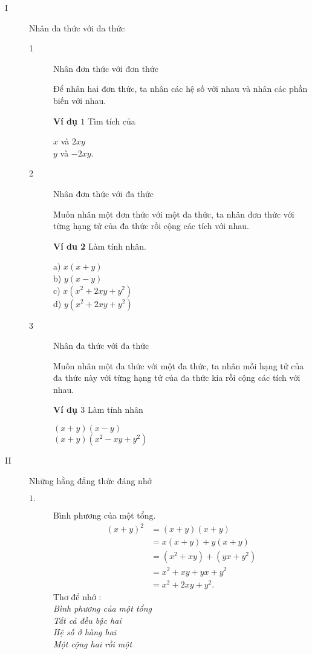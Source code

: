 \documentclass[14pt,twoside,a4paper, openany]{book}
\theoremstyle{definition}
\theoremstyle{plain}
\newcommand{\hop}[1]{\begin{tcolorbox}[colback=cyan!15,colframe=orange!75!white]{#1}\end{tcolorbox}}
\begin{document}
\boldmath
\begin{description}
\item[I] Nhân đa thức với đa thức
\begin{description}
\item[1] Nhân đơn thức với đơn thức
\hop{
Để nhân hai đơn thức, ta nhân các hệ số với nhau và nhân các phần biến với nhau.
}
\textbf{Ví dụ $1$} Tìm tích của
\begin{multicols}{2}
 $x$ và $2xy$\\
$y$ và $-2xy$.
\end{multicols}


\item[2] Nhân đơn thức với đa thức
\hop{
Muốn nhân một đơn thức với một đa thức, ta nhân đơn thức với từng hạng tử của đa thức rồi cộng các tích với nhau.}
\textbf{Ví du 2} Làm tính nhân.
\begin{multicols}{2}
\noindent a) $x(x+y)$\\
b) $y(x-y)$\\
c) $x(x^2+2xy+y^2)$\\
d) $y(x^2+2xy+y^2)$
\end{multicols}


\item[3] Nhân đa thức với đa thức
\hop{Muốn nhân một đa thức với một đa thức, ta nhân mỗi hạng tử của đa thức này với từng hạng tử của đa thức kia rồi cộng các tích với nhau.}
\textbf{Ví dụ $3$} Làm tính nhân
\begin{multicols}{2}
$(x+y)(x-y)$\\
$(x+y)(x^2-xy+y^2)$
\end{multicols}
\end{description}
\item[II] Những hằng đẳng thức đáng nhớ
\begin{description}
\item[$1.$] Bình phương của một tổng.
\begin{equation*}
\begin{split}
(x+y)^{2}&=(x+y)(x+y)\\
                 &=x(x+y)+y(x+y)\\
                   &=(x^2+xy)+(yx+y^2)\\
                &=x^2+xy+yx+y^2\\
                &=x^2+2xy+y^2.
\end{split}
\end{equation*}
Thơ để nhớ :\\
\emph{Bình phương của một tổng\\
Tất cả đều bậc hai\\
Hệ số ở hàng hai\\
Một cộng hai rồi một}\\


\end{description}
\end{description}
\end{document}
